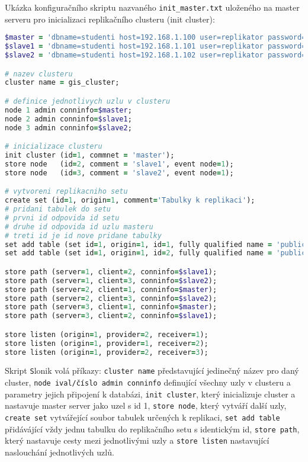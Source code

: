 Ukázka konfiguračního skriptu nazvaného \texttt{init\_master.txt} uloženého na master serveru pro inicializaci replikačního clusteru (init cluster):

\begin{lstlisting}[language=ruby]
$master = 'dbname=studenti host=192.168.1.100 user=replikator password=kgigis'
$slave1 = 'dbname=studenti host=192.168.1.101 user=replikator password=kgigis'
$slave2 = 'dbname=studenti host=192.168.1.102 user=replikator password=kgigis'

# nazev clusteru
cluster name = gis_cluster;

# definice jednotlivych uzlu v clusteru
node 1 admin conninfo=$master;
node 2 admin conninfo=$slave1;
node 3 admin conninfo=$slave2;

# inicializace clusteru
init cluster (id=1, commnet = 'master');
store node   (id=2, comment = 'slave1', event node=1);
store node   (id=3, comment = 'slave2', event node=1);

# vytvoreni replikacniho setu
create set (id=1, origin=1, comment='Tabulky k replikaci');
# pridani tabulek do setu
# prvni id odpovida id setu
# druhe id odpovida id uzlu masteru
# treti id je id nove pridane tabulky
set add table (set id=1, origin=1, id=1, fully qualified name = 'public.student', comment='seznam studentu');
set add table (set id=1, origin=1, id=2, fully qualified name = 'public.rodne_mesto', comment='seznam mest');

store path (server=1, client=2, conninfo=$slave1);
store path (server=1, client=3, conninfo=$slave2);
store path (server=2, client=1, conninfo=$master);
store path (server=2, client=3, conninfo=$slave2);
store path (server=3, client=1, conninfo=$master);
store path (server=3, client=2, conninfo=$slave1);

store listen (origin=1, provider=2, receiver=1);
store listen (origin=1, provider=1, receiver=2);
store listen (origin=1, provider=2, receiver=3);
\end{lstlisting}

Skript {\texttt Slonik} volá příkazy:
\texttt{cluster name} představující jedinečný název pro daný cluster,
\texttt{node ival/číslo admin conninfo} definující všechny uzly v clusteru a parametry jejich připojení k databázi,
\texttt{init cluster}, který inicializuje cluster a nastavuje master server jako uzel s id 1, 
\texttt{store node}, který vytváří další uzly,
\texttt{create set} vytvářející soubor tabulek určených k replikaci, 
\texttt{set add table} přidávájící vždy jednu tabulku do replikačního setu s identickým id,
\texttt{store path}, který nastavuje cesty mezi jednotlivými uzly a 
\texttt{store listen} nastavující naslouchání jednotlivých uzlů. 

